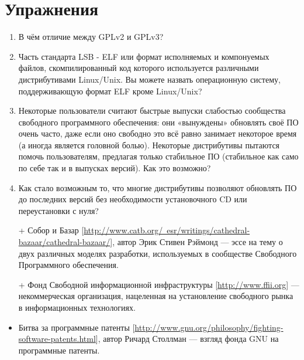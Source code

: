 \documentclass[10pt]{book}
\begin{document}
\newpage
{\color{white}\section{Упражнения}}
\begin{tcolorbox}[title=\textbf{Упражнения}, colback=yellow!14!white, colframe=red!75!white]
\begin{enumerate}
	\item В чём отличие между GPLv2 и GPLv3?
	\item Часть стандарта LSB  - ELF или формат исполняемых и компонуемых файлов, скомпилированный код которого используется различными дистрибутивами Linux/Unix. Вы можете назвать операционную систему, поддерживающую формат ELF кроме Linux/Unix?
	\item Некоторые пользователи считают быстрые выпуски слабостью сообщества свободного программного обеспечения: они «вынуждены» обновлять своё ПО очень часто, даже если оно свободно это всё равно занимает некоторое время (а иногда является головной болью). Некоторые дистрибутивы пытаются помочь пользователям, предлагая только стабильное ПО (стабильное как само по себе так и в выпусках версий). Как это возможно?
	\item Как стало возможным то, что многие дистрибутивы позволяют обновлять ПО до последних версий без необходимости установочного CD или переустановки с нуля?
\end{enumerate}
\end{tcolorbox}

\phantom{}
\begin{tcolorbox}[title=\textbf{Дальнейшие ресурсы}, colback=yellow!14!white, colframe=red!75!blue]
\begin{itemize}
	\item[+] Собор и Базар  [\href{http://www.catb.org/~esr/writings/cathedral-bazaar/cathedral-bazaar/}{http://www.catb.org/~esr/writings/cathedral-bazaar/cathedral-bazaar/}], автор Эрик Стивен Рэймонд — эссе на тему о двух различных моделях разработки, используемых в сообществе Свободного Программного обеспечения.
	\item[+] Фонд Свободной  информационной инфраструктуры  [\href{http://www.ffii.org}{http://www.ffii.org}] — некоммерческая организация, нацеленная на установление свободного рынка в информационных технологиях.
	\item Битва за программные патенты [\href{http://www.gnu.org/philosophy/fighting-software-patents.html}{http://www.gnu.org/philosophy/fighting-software-patents.html}], автор Ричард Столлман — взгляд фонда GNU на программные патенты.
\end{itemize}
\end{tcolorbox}
\end{document}
